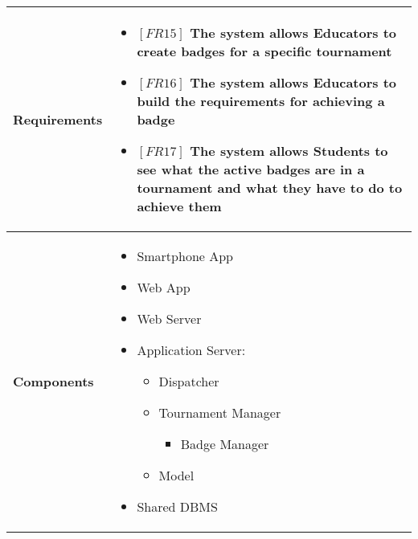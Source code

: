 \documentclass{article}
\begin{document}
\begin{table}[H]
 \renewcommand{\arraystretch}{1.5}
    \centering
    \begin{tabular}{|l|p{10cm}|}
        \hline
        \textbf{Requirements} &
        \vspace{-0.6cm}
        \begin{itemize}[label={}, left=0pt, align=left, itemsep=5pt]
            \item $[FR15]$ The system allows Educators to create badges for a specific tournament
            \item $[FR16]$ The system allows Educators to build the requirements for achieving a badge
            \item $[FR17]$ The system allows Students to see what the active badges are in a tournament and what they have to do to achieve them
        \end{itemize} \\
        \hline
        \textbf{Components} & 
        \begin{itemize}[align=left, topsep=0pt, partopsep=0pt]
            \item Smartphone App
            \item Web App
            \item Web Server
            \item Application Server:
            \begin{itemize}
                \item Dispatcher
                \item Tournament Manager
                \begin{itemize}
                    \item Badge Manager
                \end{itemize}
                \item Model
            \end{itemize}
            \item Shared DBMS 
        \end{itemize} \\
        \hline
    \end{tabular}
\end{table}
\end{document}
